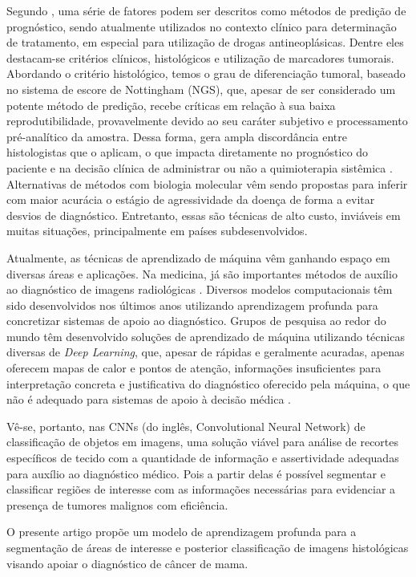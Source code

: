 \documentclass[12pt]{article}
\begin{document}
Segundo , uma série de fatores podem ser descritos como métodos de predição de prognóstico, sendo atualmente utilizados no contexto clínico para determinação de tratamento, em especial para utilização de drogas antineoplásicas. Dentre eles destacam-se critérios clínicos, histológicos e utilização de marcadores tumorais. Abordando o critério histológico, temos o grau de diferenciação tumoral, baseado no sistema de escore de Nottingham (NGS), que, apesar de ser considerado um potente método de predição, recebe críticas em relação à sua baixa reprodutibilidade, provavelmente devido ao seu caráter subjetivo e processamento pré-analítico da amostra. Dessa forma, gera ampla discordância entre histologistas que o aplicam, o que impacta diretamente no prognóstico do paciente e na decisão clínica de administrar ou não a quimioterapia sistêmica \cite{tiezzi2020}.
Alternativas de métodos com biologia molecular vêm sendo propostas para inferir com maior acurácia o estágio de agressividade da doença de forma a evitar desvios de diagnóstico. Entretanto, essas são técnicas de alto custo, inviáveis em muitas situações, principalmente em países subdesenvolvidos.

Atualmente, as técnicas de aprendizado de máquina vêm ganhando espaço em diversas áreas e aplicações. Na medicina, já são importantes métodos de auxílio ao diagnóstico de imagens radiológicas \cite{hu2018}. Diversos modelos computacionais têm sido desenvolvidos nos últimos anos utilizando aprendizagem profunda para concretizar sistemas de apoio ao diagnóstico. Grupos de pesquisa ao redor do mundo têm desenvolvido soluções de aprendizado de máquina utilizando técnicas diversas de {\it Deep Learning}, que, apesar de rápidas e geralmente acuradas, apenas oferecem mapas de calor e pontos de atenção, informações insuficientes para interpretação concreta e justificativa do diagnóstico oferecido pela máquina, o que não é adequado para sistemas de apoio à decisão médica \cite{li2021}.

Vê-se, portanto, nas CNNs (do inglês, Convolutional Neural Network) de classificação de objetos em imagens, uma solução viável para análise de recortes específicos de tecido com a quantidade de informação e assertividade adequadas para auxílio ao diagnóstico médico. Pois a partir delas é possível segmentar e classificar regiões de interesse com as informações necessárias para evidenciar a presença de tumores malignos com eficiência.

O presente artigo propõe um modelo  de aprendizagem profunda para a segmentação de áreas de interesse e posterior classificação de imagens histológicas visando apoiar o diagnóstico de câncer de mama.
\end{document}
